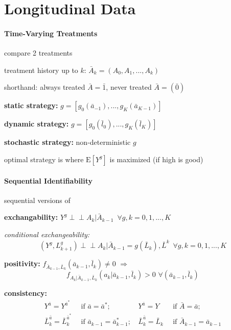 \documentclass[8pt]{extarticle}
\newcommand{\indep}{\perp \!\!\! \perp}
\begin{document}



\section{Longitudinal Data}
\begin{multicols}{2}

\paragraph{\large Time-Varying Treatments} compare 2 treatments

\noindent treatment history up to $k$: $\bar{A}_k=(A_0, A_1, ..., A_k)$

\noindent shorthand: always treated $\bar{A} = \bar{1}$, never treated $\bar{A} = \left(\bar{0}\right)$

\textbf{static strategy:} $g=\left[g_0(\bar{a}_{-1}), ..., g_K(\bar{a}_{K-1})\right]$

\textbf{dynamic strategy:} $g=\left[g_0(\bar{l}_0), ..., g_K(\bar{l}_K)\right]$

\textbf{stochastic strategy:} non-deterministic $g$

\noindent optimal strategy is where $\mathrm{E}\left[Y^g\right]$ is maximized (if high is good)






\paragraph{\large Sequential Identifiability} sequential versions of

 \textbf{exchangability:}
$Y^g \indep A_k| \bar{A}_{k-1} \,\,\, \forall g, k=0,1,...,K$

\textit{conditional exchangeability:}
$$\left(Y^g, L^g_{k+1}\right) \indep A_k| \bar{A}_{k-1} {=} g\left(\bar{L}_k\right), \bar{L}^k \,\,\, \forall g, k=0,1,...,K$$

 \textbf{positivity:} $f_{\bar{A}_{k-1},\bar{L}_k}(\bar{a}_{k-1},\bar{l}_k)\neq 0 \,\, \Rightarrow$
$$ f_{A_k|\bar{A}_{k-1},\bar{L}_k}(a_k|\bar{a}_{k-1},\bar{l}_k)>0 \,\, \forall \left(\bar{a}_{k-1},\bar{l}_k\right)$$

 \textbf{consistency:} 
\begin{align*}
Y^{\bar{a}} = Y^{\bar{a}^*} & \, \text{ if } {\bar{a}} = {\bar{a}^*};  & \,
Y^{\bar{a}} = Y & \, \text{ if } {\bar{A}} = {\bar{a}};  \\
\bar{L}^{\bar{a}}_k = \bar{L}^{\bar{a}^*}_k & \, \text{ if } {\bar{a}_{k-1}} = {\bar{a}^*_{k-1}}; & \,
\bar{L}^{\bar{a}}_k = \bar{L}_k & \, \text{ if } {\bar{A}_{k-1}} = {\bar{a}_{k-1}}
\end{align*}



\end{multicols}
\end{document}
